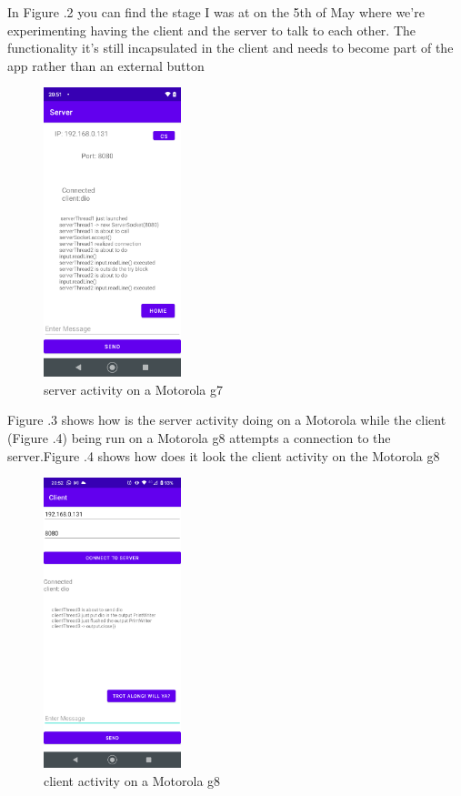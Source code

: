\documentclass[a4paper,12pt]{article}
\begin{document}
In Figure .2 you can find the stage I was at on the 5th of May where we're experimenting having the client and the server to talk to each other. The functionality it's still incapsulated in the client and needs to become part of the app rather than an external button

\clearpage

\begin{figure}
\includegraphics[width=4cm]{./server_g7.PNG}
\caption{server activity on a Motorola g7}\label{wrap-fig:3}
\end{figure}
Figure .3 shows how is the server activity doing on a Motorola while the client (Figure .4) being run on a Motorola g8 attempts a connection to the server.Figure .4 shows how does it look the client activity on the Motorola g8

\clearpage

\begin{figure}
\includegraphics[width=4cm]{./client_g8.PNG}
\caption{client activity on a Motorola g8}\label{wrap-fig:4}
\end{figure}
\end{document}
